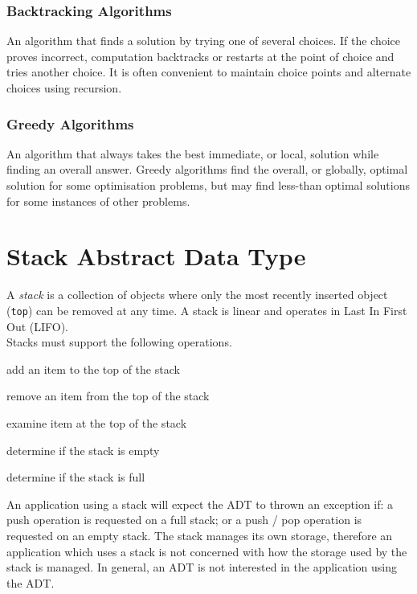 \subsubsection{Backtracking Algorithms}
An algorithm that finds a solution by trying one of several choices. If the choice proves incorrect, computation backtracks or restarts at the point of choice and tries another choice. It is often convenient to maintain choice points and alternate choices using recursion.
\subsubsection{Greedy Algorithms}
An algorithm that always takes the best immediate, or local, solution while finding an overall answer. Greedy algorithms find the overall, or globally, optimal solution for some optimisation problems, but may find less-than optimal solutions for some instances of other problems.

\section{Stack Abstract Data Type}
A \textit{stack} is a collection of objects where only the most recently inserted object (\verb|top|) can be removed at any time. A stack is linear and operates in Last In First Out (LIFO). \\

Stacks must support the following operations.
\begin{description}[font=\ttfamily]
    \item[push] add an item to the top of the stack
    \item[pop] remove an item from the top of the stack
    \item[peek] examine item at the top of the stack
    \item[empty] determine if the stack is empty
    \item[full] determine if the stack is full
\end{description}

An application using a stack will expect the ADT to thrown an exception if: a push operation is requested on a full stack; or a push / pop operation is requested on an empty stack. The stack manages its own storage, therefore an application which uses a stack is not concerned with how the storage used by the stack is managed. In general, an ADT is not interested in the application using the ADT.\\

